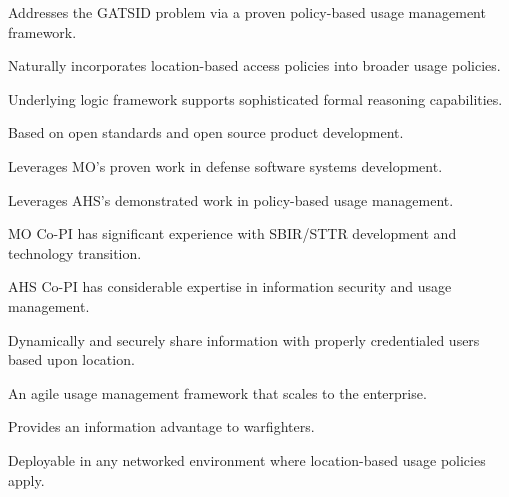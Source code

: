 \documentclass{sbir}
\begin{document}
\begin{evalbox}
  \begin{evalitemize}
     \item Addresses the GATSID problem via a proven policy-based usage management framework.
     \item Naturally incorporates location-based access policies into broader usage policies.
     \item Underlying logic framework supports sophisticated formal reasoning capabilities.
  \end{evalitemize}
  \begin{evalitemize}
     \item Based on open standards and open source product development.
     \item Leverages MO's proven work in defense software systems development.
     \item Leverages AHS's demonstrated work in policy-based usage management.
  \end{evalitemize}
  \begin{evalitemize}
     \item MO Co-PI has significant experience with SBIR/STTR development and technology transition.
     \item AHS Co-PI has considerable expertise in information security and usage management.
  \end{evalitemize}
  \begin{evalitemize}
     \item Dynamically and securely share information with properly credentialed users based upon location.
     \item An agile usage management framework that scales to the enterprise.
     \item Provides an information advantage to warfighters.
  \end{evalitemize}
  \begin{evalitemize}
     \item Deployable in any networked environment where location-based usage policies apply.
  \end{evalitemize}
\end{evalbox}
\end{document}
